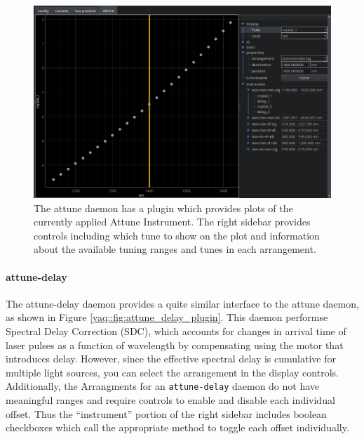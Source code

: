 \begin{landscape}
\begin{figure}
\includegraphics[width=8in]{"yaq/images/attune_plugin"}
\caption[\yaqcqtpy{} Attune Plugin]{
	The attune daemon has a plugin which provides plots of the currently applied Attune Instrument.
	The right sidebar provides controls including which tune to show on the plot and information about the available tuning ranges and tunes in each arrangement.
}
\label{yaq:fig:attune_plugin}
\end{figure}
\end{landscape}

\paragraph{attune-delay}

The attune-delay daemon provides a quite similar interface to the attune daemon, as shown in Figure \ref{yaq::fig:attune_delay_plugin}.
This daemon performse Spectral Delay Correction (SDC), which accounts for changes in arrival time of laser pulses as a function of wavelength by compensating using the motor that introduces delay.
However, since the effective spectral delay is cumulative for multiple light sources, you can select the arrangement in the display controls.
Additionally, the Arrangments for an \texttt{attune-delay} daemon do not have meaningful ranges and require controls to enable and disable each individual offset.
Thus the ``instrument'' portion of the right sidebar includes boolean checkboxes which call the appropriate method to toggle each offset individually.

